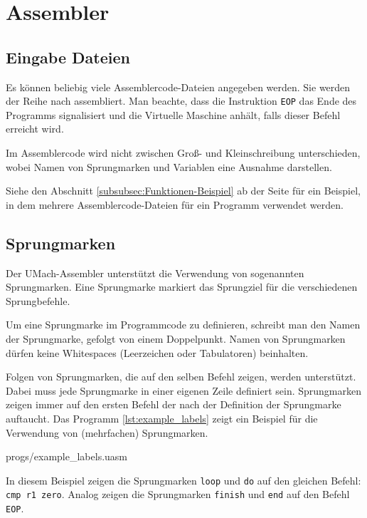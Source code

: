 \section{Assembler}

\subsection{Eingabe Dateien}

Es können beliebig viele Assemblercode-Dateien angegeben werden. Sie werden der
Reihe nach assembliert. Man beachte, dass die Instruktion \texttt{EOP} das
Ende des Programms signalisiert und die Virtuelle Maschine anhält, falls dieser
Befehl erreicht wird.

Im Assemblercode wird nicht zwischen Groß- und Kleinschreibung unterschieden,
wobei Namen von Sprungmarken und Variablen eine Ausnahme darstellen.

Siehe den Abschnitt \ref{subsubsec:Funktionen-Beispiel} ab der Seite
\pageref{subsubsec:Funktionen-Beispiel} für ein Beispiel, in dem mehrere
Assemblercode-Dateien für ein Programm verwendet werden.

\subsection{Sprungmarken}

Der UMach-Assembler unterstützt die Verwendung von sogenannten Sprungmarken.
Eine Sprungmarke markiert das Sprungziel für die verschiedenen Sprungbefehle.

Um eine Sprungmarke im Programmcode zu definieren, schreibt man den Namen der
Sprungmarke, gefolgt von einem Doppelpunkt. Namen von Sprungmarken dürfen keine
Whitespaces (Leerzeichen oder Tabulatoren) beinhalten.

Folgen von Sprungmarken, die auf den selben Befehl zeigen, werden unterstützt.
Dabei muss jede Sprungmarke in einer eigenen Zeile definiert sein. Sprungmarken
zeigen immer auf den ersten Befehl der nach der Definition der Sprungmarke
auftaucht. Das Programm \ref{lst:example_labels} zeigt ein Beispiel für die 
Verwendung von (mehrfachen) Sprungmarken.


{progs/example_labels.uasm}

In diesem Beispiel zeigen die Sprungmarken \texttt{loop} und \texttt{do} auf den
gleichen Befehl: \texttt{cmp r1 zero}. Analog zeigen die Sprungmarken
\texttt{finish} und \texttt{end} auf den Befehl \texttt{EOP}.

